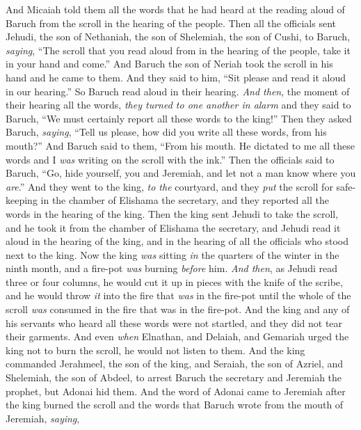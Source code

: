 \begin{biblechapter}
\verse And Micaiah told them all the words that he had heard at the reading aloud of Baruch from the scroll in the hearing of the people.
\verse Then all the officials sent Jehudi, the son of Nethaniah, the son of Shelemiah, the son of Cushi, to Baruch, \textit{saying}, “The scroll that you read aloud from in the hearing of the people, take it in your hand and come.” And Baruch the son of Neriah took the scroll in his hand and he came to them.
\verse And they said to him, “Sit please and read it aloud in our hearing.” So Baruch read aloud in their hearing.
\verse \textit{And then}, the moment of their hearing all the words, \textit{they turned to one another in alarm} and they said to Baruch, “We must certainly report all these words to the king!”
\verse Then they asked Baruch, \textit{saying}, “Tell us please, how did you write all these words, from his mouth?”
\verse And Baruch said to them, “From his mouth. He dictated to me all these words and I \textit{was} writing on the scroll with the ink.”
\verse Then the officials said to Baruch, “Go, hide yourself, you and Jeremiah, and let not a man know where you \textit{are}.”
\verse And they went to the king, \textit{to the} courtyard, and they \textit{put} the scroll for safe-keeping in the chamber of Elishama the secretary, and they reported all the words in the hearing of the king.
\verse Then the king sent Jehudi to take the scroll, and he took it from the chamber of Elishama the secretary, and Jehudi read it aloud in the hearing of the king, and in the hearing of all the officials who stood next to the king.
\verse Now the king \textit{was} sitting \textit{in} the quarters of the winter in the ninth month, and a fire-pot \textit{was} burning \textit{before} him.
\verse \textit{And then}, as Jehudi read three or four columns, he would cut it up in pieces with the knife of the scribe, and he would throw \textit{it} into the fire that \textit{was} in the fire-pot until the whole of the scroll \textit{was} consumed in the fire that was in the fire-pot.
\verse And the king and any of his servants who heard all these words were not startled, and they did not tear their garments.
\verse And even \textit{when} Elnathan, and Delaiah, and Gemariah urged the king not to burn the scroll, he would not listen to them.
\verse And the king commanded Jerahmeel, the son of the king, and Seraiah, the son of Azriel, and Shelemiah, the son of Abdeel, to arrest Baruch the secretary and Jeremiah the prophet, but Adonai hid them.
\verse And the word of Adonai came to Jeremiah after the king burned the scroll and the words that Baruch wrote from the mouth of Jeremiah, \textit{saying},

\end{biblechapter}
